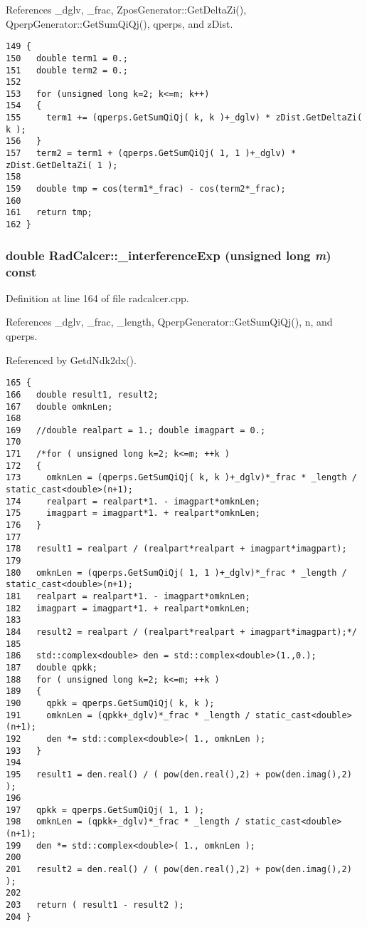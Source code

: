 References \_\-dglv, \_\-frac, ZposGenerator::GetDeltaZi(), QperpGenerator::GetSumQiQj(), qperps, and zDist.

\begin{Code}\begin{verbatim}149 {
150   double term1 = 0.;
151   double term2 = 0.;
152 
153   for (unsigned long k=2; k<=m; k++)
154   {
155     term1 += (qperps.GetSumQiQj( k, k )+_dglv) * zDist.GetDeltaZi( k );
156   }
157   term2 = term1 + (qperps.GetSumQiQj( 1, 1 )+_dglv) * zDist.GetDeltaZi( 1 );
158 
159   double tmp = cos(term1*_frac) - cos(term2*_frac);
160 
161   return tmp;
162 }
\end{verbatim}
\end{Code}


\subsubsection{\setlength{\rightskip}{0pt plus 5cm}double RadCalcer::\_\-interferenceExp (unsigned long {\em m}) const\hspace{0.3cm}{\tt  [private]}}\label{classRadCalcer_6f89500579873100e9d69a79b5738c4b}




Definition at line 164 of file radcalcer.cpp.

References \_\-dglv, \_\-frac, \_\-length, QperpGenerator::GetSumQiQj(), n, and qperps.

Referenced by GetdNdk2dx().

\begin{Code}\begin{verbatim}165 {
166   double result1, result2;
167   double omknLen;
168 
169   //double realpart = 1.; double imagpart = 0.;
170 
171   /*for ( unsigned long k=2; k<=m; ++k )
172   {
173     omknLen = (qperps.GetSumQiQj( k, k )+_dglv)*_frac * _length / static_cast<double>(n+1);
174     realpart = realpart*1. - imagpart*omknLen;
175     imagpart = imagpart*1. + realpart*omknLen;
176   }
177 
178   result1 = realpart / (realpart*realpart + imagpart*imagpart);
179 
180   omknLen = (qperps.GetSumQiQj( 1, 1 )+_dglv)*_frac * _length / static_cast<double>(n+1);
181   realpart = realpart*1. - imagpart*omknLen;
182   imagpart = imagpart*1. + realpart*omknLen;
183 
184   result2 = realpart / (realpart*realpart + imagpart*imagpart);*/
185 
186   std::complex<double> den = std::complex<double>(1.,0.);
187   double qpkk;
188   for ( unsigned long k=2; k<=m; ++k ) 
189   {
190     qpkk = qperps.GetSumQiQj( k, k );
191     omknLen = (qpkk+_dglv)*_frac * _length / static_cast<double>(n+1);
192     den *= std::complex<double>( 1., omknLen );
193   }
194   
195   result1 = den.real() / ( pow(den.real(),2) + pow(den.imag(),2) );
196   
197   qpkk = qperps.GetSumQiQj( 1, 1 );
198   omknLen = (qpkk+_dglv)*_frac * _length / static_cast<double>(n+1);
199   den *= std::complex<double>( 1., omknLen );
200   
201   result2 = den.real() / ( pow(den.real(),2) + pow(den.imag(),2) );
202   
203   return ( result1 - result2 );
204 }
\end{verbatim}
\end{Code}


